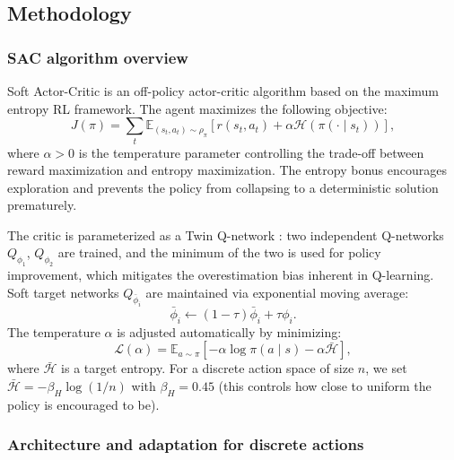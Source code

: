 \documentclass[onecolumn]{cwpreport} %
\begin{document}
\subsection{Methodology}

\subsubsection{SAC algorithm overview}

Soft Actor-Critic \citep{haarnoja2018soft} is an off-policy actor-critic algorithm based on the maximum entropy RL framework. The agent maximizes the following objective:
\begin{equation}
    J(\pi) = \sum_t \mathbb{E}_{(s_t, a_t) \sim \rho_\pi} \left[ r(s_t, a_t) + \alpha \mathcal{H}(\pi(\cdot \mid s_t)) \right],
\end{equation}
where $\alpha > 0$ is the temperature parameter controlling the trade-off between reward maximization and entropy maximization. The entropy bonus encourages exploration and prevents the policy from collapsing to a deterministic solution prematurely.

The critic is parameterized as a Twin Q-network \citep{vanhasselt2015deep}: two independent Q-networks $Q_{\phi_1}$, $Q_{\phi_2}$ are trained, and the minimum of the two is used for policy improvement, which mitigates the overestimation bias inherent in Q-learning. Soft target networks $Q_{\bar{\phi}_i}$ are maintained via exponential moving average:
\begin{equation}
    \bar{\phi}_i \leftarrow (1-\tau)\bar{\phi}_i + \tau \phi_i.
\end{equation}
The temperature $\alpha$ is adjusted automatically by minimizing:
\begin{equation}
    \mathcal{L}(\alpha) = \mathbb{E}_{a \sim \pi} \left[ -\alpha \log \pi(a \mid s) - \alpha \bar{\mathcal{H}} \right],
\end{equation}
where $\bar{\mathcal{H}}$ is a target entropy. For a discrete action space of size $n$, we set $\bar{\mathcal{H}} = -\beta_H \log(1/n)$ with $\beta_H = 0.45$ (this controls how close to uniform the policy is encouraged to be).

\subsubsection{Architecture and adaptation for discrete actions}
\end{document}
